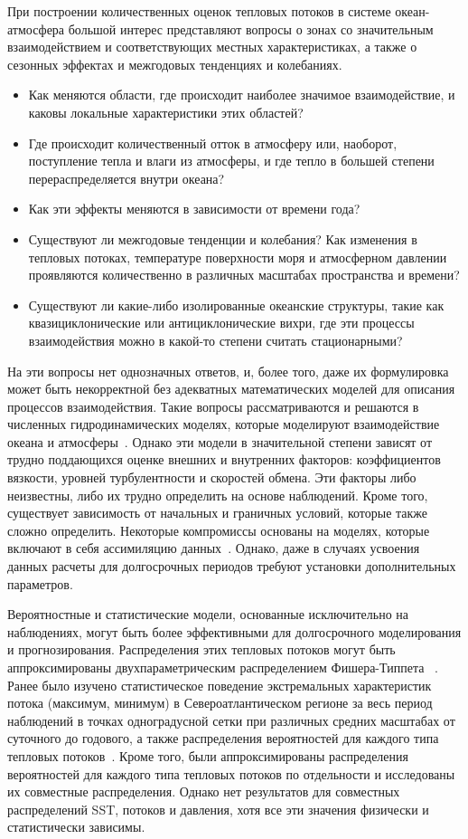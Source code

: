 При построении количественных оценок тепловых потоков в системе океан-атмосфера большой интерес представляют вопросы о зонах со значительным взаимодействием и соответствующих местных характеристиках, а также о сезонных эффектах и межгодовых тенденциях и колебаниях.
\begin{itemize}
	\item Как меняются области, где происходит наиболее значимое взаимодействие, и каковы локальные характеристики этих областей?
	\item Где происходит количественный отток в атмосферу или, наоборот, поступление тепла и влаги из атмосферы, и где тепло в большей степени перераспределяется внутри океана?
	\item Как эти эффекты меняются в зависимости от времени года?
	\item Существуют ли межгодовые тенденции и колебания? Как изменения в тепловых потоках, температуре поверхности моря и атмосферном давлении проявляются количественно в различных масштабах пространства и времени?
	\item Существуют ли какие-либо изолированные океанские структуры, такие как квазициклонические или антициклонические вихри, где эти процессы взаимодействия можно в какой-то степени считать стационарными?
\end{itemize}
На эти вопросы нет однозначных ответов, и, более того, даже их формулировка может быть некорректной без адекватных математических моделей для описания процессов взаимодействия.
Такие вопросы рассматриваются и решаются в численных гидродинамических моделях, которые моделируют взаимодействие океана и атмосферы~\cite{gulev2012probability}.
Однако эти модели в значительной степени зависят от трудно поддающихся оценке внешних и внутренних факторов: коэффициентов вязкости, уровней турбулентности и скоростей обмена. Эти факторы либо неизвестны, либо их трудно определить на основе наблюдений. Кроме того, существует зависимость от начальных и граничных условий, которые также сложно определить. Некоторые компромиссы основаны на моделях, которые включают в себя ассимиляцию данных~\cite{FAO}. Однако, даже в случаях усвоения данных расчеты для долгосрочных периодов требуют установки дополнительных параметров.

Вероятностные и статистические модели, основанные исключительно на наблюдениях, могут быть более эффективными для долгосрочного моделирования и прогнозирования.
Распределения этих тепловых потоков могут быть аппроксимированы двухпараметрическим распределением Фишера-Типпета ~\cite{gulev2012probability}.
Ранее было изучено статистическое поведение экстремальных характеристик потока (максимум, минимум) в Североатлантическом регионе за весь период наблюдений в точках одноградусной сетки при различных средних масштабах от суточного до годового, а также распределения вероятностей для каждого типа тепловых потоков~\cite{FAO}.
Кроме того, были аппроксимированы распределения вероятностей для каждого типа тепловых потоков по отдельности и исследованы их совместные распределения.
Однако нет результатов для совместных распределений SST, потоков и давления, хотя все эти значения физически и статистически зависимы.

